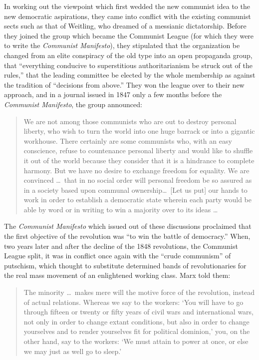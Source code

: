 In working out the viewpoint which first wedded the new communist idea to the new democratic aspirations, they came into conflict with the existing communist sects such as that of Weitling, who dreamed of a messianic dictatorship. Before they joined the group which became the Communist League (for which they were to write the \emph{Communist Manifesto}), they stipulated that the organization be changed from an elite conspiracy of the old type into an open propaganda group, that ``everything conducive to superstitious authoritarianism be struck out of the rules,'' that the leading committee be elected by the whole membership as against the tradition of ``decisions from above.'' They won the league over to their new approach, and in a journal issued in 1847 only a few months before the \emph{Communist Manifesto}, the group announced:

\blockquote{We are not among those communists who are out to destroy personal liberty, who wish to turn the world into one huge barrack or into a gigantic workhouse. There certainly are some communists who, with an easy conscience, refuse to countenance personal liberty and would like to shuffle it out of the world because they consider that it is a hindrance to complete harmony. But we have no desire to exchange freedom for equality. We are convinced \ldots\ that in no social order will personal freedom be so assured as in a society based upon communal ownership\ldots\ [Let us put] our hands to work in order to establish a democratic state wherein each party would be able by word or in writing to win a majority over to its ideas \ldots}

The \emph{Communist Manifesto} which issued out of these discussions proclaimed that the first objective of the revolution was ``to win the battle of democracy.'' When, two years later and after the decline of the 1848 revolutions, the Communist League split, it was in conflict once again with the ``crude communism'' of putschism, which thought to substitute determined bands of revolutionaries for the real mass movement of an enlightened working class. Marx told them:

\blockquote{The minority \ldots\ makes mere will the motive force of the revolution, instead of actual relations. Whereas we say to the workers: `You will have to go through fifteen or twenty or fifty years of civil wars and international wars, not only in order to change extant conditions, but also in order to change yourselves and to render yourselves fit for political dominion,' you, on the other hand, say to the workers: `We must attain to power at once, or else we may just as well go to sleep.'}

